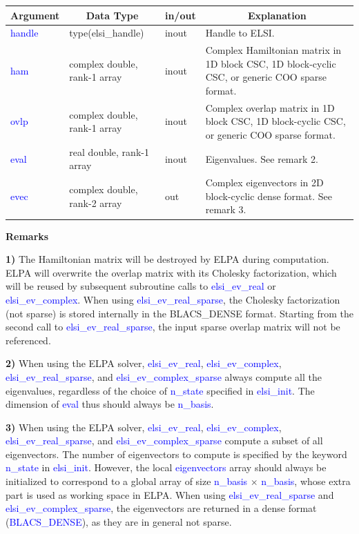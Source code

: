 \documentclass{report}
\begin{document}
\begin{table}[h]
\centering
\begin{tabular}[]{|p{20mm}|p{45mm}|p{15mm}|p{85mm}|}
\hline
\multicolumn{1}{|c|}{\textbf{Argument}} & \multicolumn{1}{c|}{\textbf{Data Type}} & \multicolumn{1}{c|}{\textbf{in/out}} & \multicolumn{1}{c|}{\textbf{Explanation}}\\
\hline
\textcolor{blue}{handle} & type(elsi\_handle)           & inout & Handle to ELSI.\\
\hline
\textcolor{blue}{ham}    & complex double, rank-1 array & inout & Complex Hamiltonian matrix in 1D block CSC, 1D block-cyclic CSC, or generic COO sparse format.\\
\hline
\textcolor{blue}{ovlp}   & complex double, rank-1 array & inout & Complex overlap matrix in 1D block CSC, 1D block-cyclic CSC, or generic COO sparse format.\\
\hline
\textcolor{blue}{eval}   & real double, rank-1 array    & inout & Eigenvalues.  See remark 2.\\
\hline
\textcolor{blue}{evec}   & complex double, rank-2 array & out   & Complex eigenvectors in 2D block-cyclic dense format.  See remark 3.\\
\hline
\end{tabular}
\end{table}

\textbf{Remarks}

\textbf{1)} The Hamiltonian matrix will be destroyed by ELPA during computation.  ELPA will overwrite the overlap matrix with its Cholesky factorization, which will be reused by subsequent subroutine calls to \textcolor{blue}{elsi\_ev\_real} or \textcolor{blue}{elsi\_ev\_complex}.  When using \textcolor{blue}{elsi\_ev\_real\_sparse}, the Cholesky factorization (not sparse) is stored internally in the BLACS\_DENSE format.  Starting from the second call to \textcolor{blue}{elsi\_ev\_real\_sparse}, the input sparse overlap matrix will not be referenced.

\textbf{2)} When using the ELPA solver, \textcolor{blue}{elsi\_ev\_real}, \textcolor{blue}{elsi\_ev\_complex}, \textcolor{blue}{elsi\_ev\_real\_sparse}, and \textcolor{blue}{elsi\_ev\_complex\_sparse} always compute all the eigenvalues, regardless of the choice of \textcolor{blue}{n\_state} specified in \textcolor{blue}{elsi\_init}.  The dimension of \textcolor{blue}{eval} thus should always be \textcolor{blue}{n\_basis}.

\textbf{3)} When using the ELPA solver, \textcolor{blue}{elsi\_ev\_real}, \textcolor{blue}{elsi\_ev\_complex}, \textcolor{blue}{elsi\_ev\_real\_sparse}, and \textcolor{blue}{elsi\_ev\_complex\_sparse} compute a subset of all eigenvectors.  The number of eigenvectors to compute is specified by the keyword \textcolor{blue}{n\_state} in \textcolor{blue}{elsi\_init}.  However, the local \textcolor{blue}{eigenvectors} array should always be initialized to correspond to a global array of size \textcolor{blue}{n\_basis} $\times$ \textcolor{blue}{n\_basis}, whose extra part is used as working space in ELPA.  When using \textcolor{blue}{elsi\_ev\_real\_sparse} and \textcolor{blue}{elsi\_ev\_complex\_sparse}, the eigenvectors are returned in a dense format (\textcolor{blue}{BLACS\_DENSE}), as they are in general not sparse.
\end{document}
